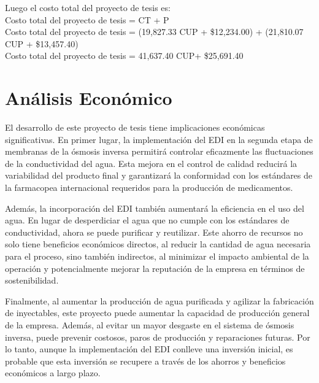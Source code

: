 Luego el costo total del proyecto de tesis es:\\
Costo total del proyecto de tesis = CT + P                                                   \\
Costo total del proyecto de tesis = (19,827.33 CUP + \$12,234.00) + (21,810.07 CUP + \$13,457.40) \\
Costo total del proyecto de tesis = 41,637.40 CUP+ \$25,691.40

\section{Análisis Económico}
El desarrollo de este proyecto de tesis tiene implicaciones económicas significativas. En primer lugar, la implementación del EDI en la segunda etapa de membranas de la ósmosis inversa permitirá controlar eficazmente las fluctuaciones de la conductividad del agua. Esta mejora en el control de calidad reducirá la variabilidad del producto final y garantizará la conformidad con los estándares de la farmacopea internacional requeridos para la producción de medicamentos.

Además, la incorporación del EDI también aumentará la eficiencia en el uso del agua. En lugar de desperdiciar el agua que no cumple con los estándares de conductividad, ahora se puede purificar y reutilizar. Este ahorro de recursos no solo tiene beneficios económicos directos, al reducir la cantidad de agua necesaria para el proceso, sino también indirectos, al minimizar el impacto ambiental de la operación y potencialmente mejorar la reputación de la empresa en términos de sostenibilidad.

Finalmente, al aumentar la producción de agua purificada y agilizar la fabricación de inyectables, este proyecto puede aumentar la capacidad de producción general de la empresa. Además, al evitar un mayor desgaste en el sistema de ósmosis inversa, puede prevenir costosos, paros de producción y reparaciones futuras. Por lo tanto, aunque la implementación del EDI conlleve una inversión inicial, es probable que esta inversión se recupere a través de los ahorros y beneficios económicos a largo plazo.








